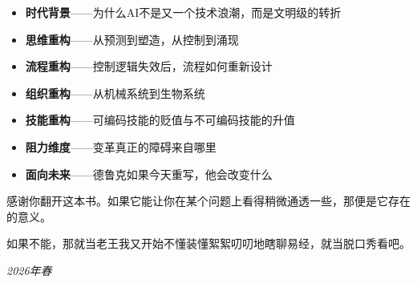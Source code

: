 \begin{itemize}
\item \textbf{时代背景}——为什么AI不是又一个技术浪潮，而是文明级的转折
\item \textbf{思维重构}——从预测到塑造，从控制到涌现
\item \textbf{流程重构}——控制逻辑失效后，流程如何重新设计
\item \textbf{组织重构}——从机械系统到生物系统
\item \textbf{技能重构}——可编码技能的贬值与不可编码技能的升值
\item \textbf{阻力维度}——变革真正的障碍来自哪里
\item \textbf{面向未来}——德鲁克如果今天重写，他会改变什么

\end{itemize}
感谢你翻开这本书。如果它能让你在某个问题上看得稍微通透一些，那便是它存在的意义。

如果不能，那就当老王我又开始不懂装懂絮絮叨叨地瞎聊易经，就当脱口秀看吧。

\textit{2026年春}
